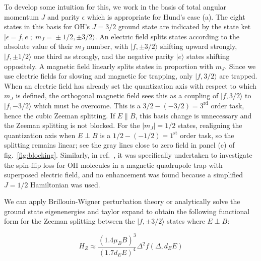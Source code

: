 \documentclass[%
 reprint,
 amsmath,amssymb,
 aps,
prl,
]{revtex4-1}
\begin{document}
To develop some intuition for this, we work in the basis of total angular momentum $J$ and parity $\epsilon$ which is appropriate for Hund's case (a). The eight states in this basis for OH's $J=3/2$ ground state are indicated by the state ket $|\epsilon\!=\!f,e\;;\;m_J\!=\!\pm1/2,\pm3/2\rangle$. An electric field splits states according to the absolute value of their $m_J$ number, with $|f,\pm3/2\rangle$ shifting upward strongly, $|f,\pm1/2\rangle$ one third as strongly, and the negative parity $|e\rangle$ states shifting oppositely. A magnetic field linearly splits states in proportion with $m_J$. Since we use electric fields for slowing and magnetic for trapping, only $|f,3/2\rangle$ are trapped. When an electric field has already set the quantization axis with respect to which $m_J$ is defined, the orthogonal magnetic field sees this as a coupling of $|f,3/2\rangle$ to $|f,-3/2\rangle$ which must be overcome. This is a $3/2-(-3/2)=3^\text{rd}$ order task, hence the cubic Zeeman splitting. If $E\parallel B$, this basis change is unnecessary and the Zeeman splitting is not blocked. For the $|m_J|=1/2$ states, realigning the quantization axis when $E\!\perp\! B$ is a $1/2-(-1/2)=1^\text{st}$ order task, so the splitting remains linear; see the gray lines close to zero field in panel (c) of fig.~\ref{fig:blocking}. Similarly, in ref.~\cite{Lara2008}, it was specifically undertaken to investigate the spin-flip loss for OH molecules in a magnetic quadrupole trap with superposed electric field, and no enhancement was found because a simplified $J=1/2$ Hamiltonian was used.

We can apply Brillouin-Wigner perturbation theory or analytically solve the ground state eigenenergies and taylor expand to obtain the following functional form for the Zeeman splitting between the $|f,\pm3/2\rangle$ states where $E\!\perp\! B$:

\begin{equation}
\label{eq:HZprop}
H_Z\approx \frac{(1.4\mu_BB)^3}{(1.7d_EE)^4}\Delta^2 f(\Delta,d_EE)
\end{equation}
\end{document}
